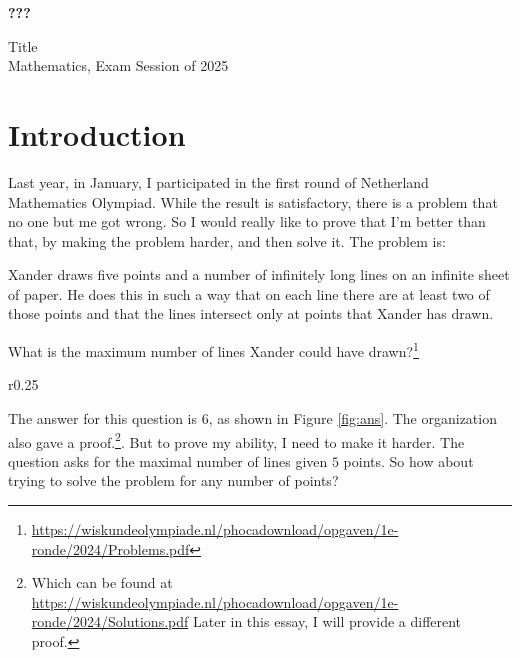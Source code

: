 \documentclass[a4paper, 12pt]{article}
\begin{document}
\begin{titlepage}
\begin{center}
\vspace*{4cm}
{\huge\textbf{???}}
\end{center}
\vspace{1cm}
\begin{flushright}
Title\\
Mathematics, Exam Session of 2025\\
\end{flushright}
\end{titlepage}

\tableofcontents
\clearpage

\section{Introduction}
Last year, in January, I participated in the  first round of Netherland Mathematics Olympiad. While the result is satisfactory, there is a problem that no one but me got wrong. So I would really like to prove that I'm better than that, by making the problem harder, and then solve it.
The problem is:

\begin{displayquote}
Xander draws five points and a number of infinitely long lines on an infinite sheet of paper. He does this in such a way that on each line there are at least two of those points and that the lines intersect only at points that Xander has drawn.

What is the maximum number of lines Xander could have drawn?\footnote{\href{https://wiskundeolympiade.nl/phocadownload/opgaven/1e-ronde/2024/Problems.pdf}{https://wiskundeolympiade.nl/phocadownload/opgaven/1e-ronde/2024/Problems.pdf}}
\end{displayquote}

\begin{wrapfigure}{r}{0.25\textwidth}
    \vspace{-0.8\baselineskip}
    
    \caption{answer to the original problem}
    \label{fig:ans}
    \vspace{-1\baselineskip}
\end{wrapfigure}
The answer for this question is $6$, as shown in Figure \ref{fig:ans}. The organization also gave a proof.\footnote{Which can be found at \href{https://wiskundeolympiade.nl/phocadownload/opgaven/1e-ronde/2024/Solutions.pdf}{https://wiskundeolympiade.nl/phocadownload/opgaven/1e-ronde/2024/Solutions.pdf} Later in this essay, I will provide a different proof.}. But to prove my ability, I need to make it harder. The question asks for the maximal number of lines given $5$ points. So how about trying to solve the problem for any number of points?
\end{document}
